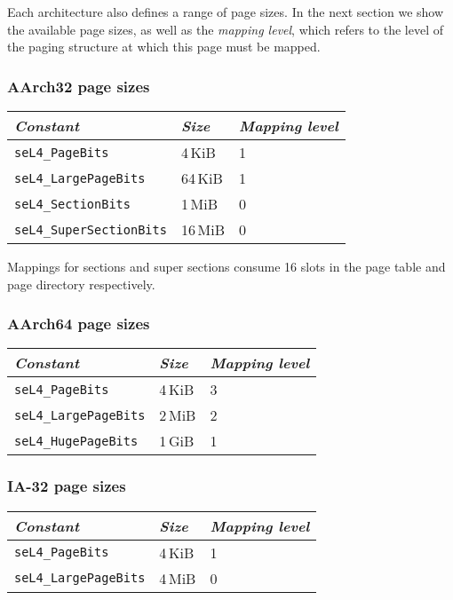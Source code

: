 Each architecture also defines a range of page sizes. In the next section we show the available page
sizes, as well as the \emph{mapping level}, which refers to
the level of the paging structure at which this page must be mapped.

\subsubsection{AArch32 page sizes}

\begin{tabularx}{\textwidth}{Xll} \toprule
    \emph{Constant}             & \emph{Size} & \emph{Mapping level} \\ \midrule
    \texttt{seL4\_PageBits}      & 4\,KiB      & 1                   \\
    \texttt{seL4\_LargePageBits} & 64\,KiB     & 1                   \\
    \texttt{seL4\_SectionBits}   & 1\,MiB      & 0                   \\
    \texttt{seL4\_SuperSectionBits} & 16\,MiB  & 0                   \\
    \bottomrule
\end{tabularx}

Mappings for sections and super sections consume 16 slots in the page table and page directory
respectively.

\subsubsection{AArch64 page sizes}

\begin{tabularx}{\textwidth}{Xll} \toprule
    \emph{Constant}             & \emph{Size} & \emph{Mapping level} \\ \midrule
    \texttt{seL4\_PageBits}      & 4\,KiB      & 3                   \\
    \texttt{seL4\_LargePageBits} & 2\,MiB     & 2                    \\
    \texttt{seL4\_HugePageBits}  & 1\,GiB     & 1                    \\
    \bottomrule
\end{tabularx}

\subsubsection{IA-32 page sizes}

\begin{tabularx}{\textwidth}{Xll} \toprule
    \emph{Constant}             & \emph{Size} & \emph{Mapping level} \\ \midrule
    \texttt{seL4\_PageBits}      & 4\,KiB      & 1                   \\
    \texttt{seL4\_LargePageBits} & 4\,MiB      & 0                   \\
    \bottomrule
\end{tabularx}

